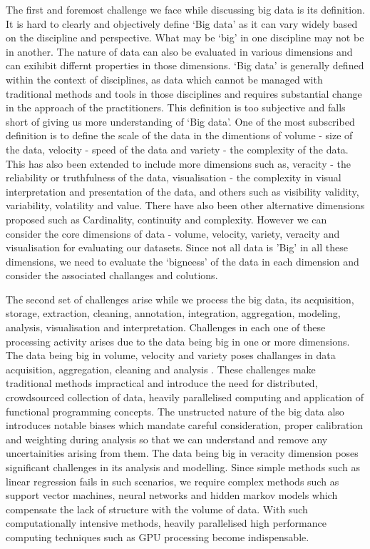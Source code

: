 The first and foremost challenge we face while discussing big data is its definition.
It is hard to clearly and objectively define `Big data' as it can vary widely based on the discipline and perspective.
What may be `big' in one discipline may not be in another.
The nature of data can also be evaluated in various dimensions and can exihibit differnt properties in those dimensions. 
`Big data' is generally defined within the context of disciplines, as data which cannot be managed with traditional methods and tools in those disciplines and requires substantial change in the approach of the practitioners.
This definition is too subjective and falls short of giving us more understanding of `Big data'.
One of the most subscribed definition is to define the scale of the data in the dimentions of volume - size of the data, velocity - speed of the data and variety  - the complexity of the data.
This has also been extended to include more dimensions such as, veracity - the reliability or truthfulness of the data, visualisation - the complexity in visual interpretation and presentation of the data, and others such as visibility validity, variability, volatility and value.
There have also been other alternative dimensions proposed such as Cardinality, continuity and complexity.
However we can consider the core dimensions of data - volume, velocity, variety, veracity and visualisation for evaluating our datasets.
Since not all data is 'Big' in all these dimensions, we need to evaluate the `bigneess' of the data in each dimension and consider the associated challanges and colutions.

The second set of challenges arise while we process the big data, its acquisition, storage, extraction, cleaning, annotation, integration, aggregation, modeling, analysis, visualisation and interpretation.
Challenges in each one of these processing activity arises due to the data being big in one or more dimensions.
The data being big in volume, velocity and variety poses challanges in data acquisition, aggregation, cleaning and analysis \cite{li2016geospatial}. 
These challenges make traditional methods impractical and introduce the need for distributed, crowdsourced collection of data, heavily parallelised computing and application of functional programming concepts.
The unstructed nature of the big data also introduces notable biases which mandate careful consideration, proper calibration and weighting during analysis so that we can understand and remove any uncertainities arising from them.
The data being big in veracity dimension poses significant challenges in its analysis and modelling.
Since simple methods such as linear regression fails in such scenarios, we require complex methods such as support vector machines, neural networks and hidden markov models which compensate the lack of structure with the volume of data.
With such computationally intensive methods, heavily parallelised high performance computing techniques such as GPU processing become indispensable.

